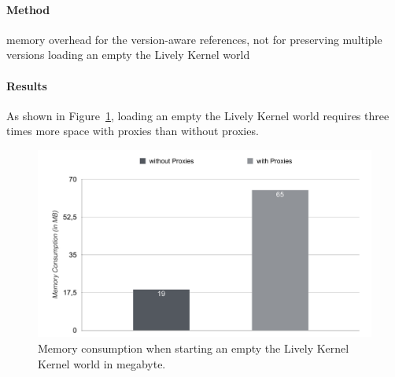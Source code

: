 

\paragraph{Method}
memory overhead for the version-aware references, not for preserving multiple versions
loading an empty the Lively Kernel world


\paragraph{Results}
As shown in Figure~\ref{fig:MemoryOverhead}, loading an empty the Lively Kernel world requires three times more space with proxies than without proxies.

\begin{figure}[h]
    \centering
    \includegraphics[width=\textwidth]{figures/6_evaluation/1_memoryOverhead.pdf}
    \caption{Memory consumption when starting an empty the Lively Kernel Kernel world in megabyte.}
    \label{fig:MemoryOverhead}
\end{figure}


